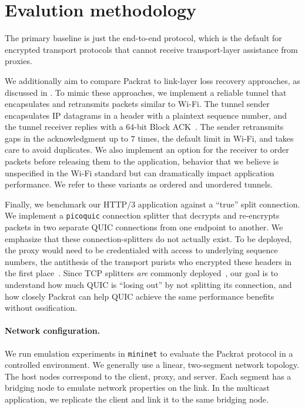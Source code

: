 \section{Evalution methodology}
\label{sec:packrat:evaluation:methodology}

The primary baseline is just the end-to-end protocol, which is the default for
encrypted transport protocols that cannot receive transport-layer assistance
from proxies.

We additionally aim to compare Packrat to link-layer loss recovery approaches,
as discussed in . To mimic these approaches, we
implement a reliable tunnel that encapsulates and retransmits packets similar
to Wi-Fi. The tunnel sender encapsulates IP datagrams in a header with a
plaintext sequence number, and the tunnel receiver replies with a 64-bit Block
ACK~\cite{ieee80211e}. The sender retransmits gaps in the acknowledgment up to
$7$ times, the default limit in Wi-Fi, and takes care to avoid duplicates. We
also implement an option for the receiver to order packets before releasing
them to the application, behavior that we believe is unspecified in the Wi-Fi
standard but can dramatically impact application performance. We refer to these
variants as ordered and unordered tunnels.

Finally, we benchmark our HTTP/3 application against a ``true'' split
connection. We implement a \texttt{picoquic} connection splitter that decrypts
and re-encrypts packets in two separate QUIC connections from one endpoint to
another. We emphasize that these connection-splitters do not actually exist. To
be deployed, the proxy would need to be credentialed with access to underlying
sequence numbers, the antithesis of the transport purists who encrypted these
headers in the first place~\cite{duke2023rfc}. Since TCP splitters \textit
{are} commonly deployed~\cite{honda2011still,rfc3135}, our goal is to
understand how much QUIC is ``losing out'' by not splitting its connection, and
how closely Packrat can help QUIC achieve the same performance benefits without
ossification.

\paragraph{Network configuration.}

We run emulation experiments in \texttt{mininet} to evaluate the Packrat protocol
in a controlled environment. We generally use a linear, two-segment network
topology.
The host nodes
correspond to the client, proxy, and server. Each segment has a bridging
node to emulate network properties on the link. In the multicast application,
we replicate the client and link it to the same bridging node.

